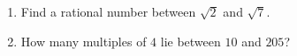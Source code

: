 \begin{enumerate}
\item Find a rational number between  $\sqrt2$ and $\sqrt7$.
\item How many multiples of $4$ lie between $10$ and $205$?   

\end{enumerate}

